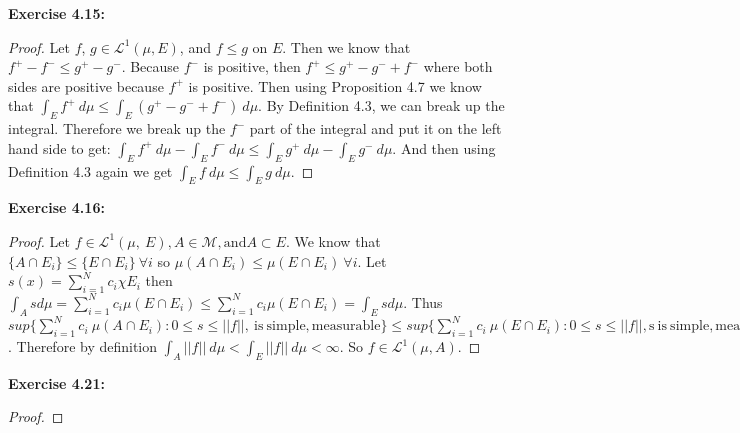 \documentclass[letterpaper,12pt]{article}
\theoremstyle{definition}
\begin{document}
\noindent\textbf{ Exercise 4.15: }
\begin{proof}
Let $f$, $g \in \mathcal{L}^1(\mu \mathrm{, } E)$, and $f \leq g$ on $E$.  Then we know that $f^+ - f^- \leq g^+ - g^-$.  Because $f^-$ is positive, then $f^+ \leq g^+ - g^- + f^-$ where both sides are positive because $f^+$ is positive.  Then using Proposition 4.7 we know that $\int_E f^+ \:d\mu \leq \int_E (g^+ - g^- + f^-) \:d\mu$.   By Definition 4.3, we can break up the integral.  Therefore we break up the $f^-$ part of the integral and put it on the left hand side to get: $\int_E f^+ \: d\mu - \int_E f^- \:d\mu \leq \int_E g^+\:d\mu - \int_E g^- \: d\mu$.  And then using Definition 4.3 again we get $\int_E f \: d\mu \leq \int_E g \: d\mu$.
\end{proof}

\noindent\textbf{ Exercise 4.16: }
\begin{proof}
Let $f \in \mathcal{L}^1(\mu, \: E) \mathrm{, } A \in \mathcal{M} \mathrm{, and } A \subset E$.  We know that $\{A \cap E_i\} \leq \{E \cap E_i \} \:\forall i$ so $\mu(A \cap E_i) \leq \mu(E \cap E_i ) \:\forall i$. Let $s(x) = \sum^N_{i=1} c_i\chi E_i$ then $\int_A sd\mu = \sum^N_{i=1} c_i\mu(E\cap E_i) \leq \sum^N_{i=1} c_i\mu(E\cap E_i) = \int_E sd\mu$.  Thus $sup\{\sum^N_{i=1} c_i \: \mu(A \cap E_i) : 0 \leq s \leq ||f|| \mathrm{, \:is \:simple, measurable}\} \leq sup\{\sum^N_{i=1} c_i \: \mu(E \cap E_i) : 0 \leq s \leq ||f|| \mathrm{, s\:is \:simple, measurable}\}$.  Therefore by definition $\int_A ||f||\:d\mu < \int_E ||f||\:d\mu < \infty$.  So $f \in \mathcal{L}^1(\mu \mathrm{, } A)$.
\end{proof}

\noindent\textbf{ Exercise 4.21: }
\begin{proof}

\end{proof}
\end{document}
